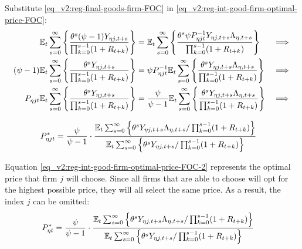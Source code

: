 \documentclass[../thesis.tex]{subfiles}
\begin{document}

Substitute \ref{eq_v2:reg-final-goods-firm-FOC} in \ref{eq_v2:reg-int-good-firm-optimal-price-FOC}:
\begin{alignat}{2}
	{\mathbb{E}_{t}} \sum_{s=0}^{\infty} \Bigg\{ \frac{\theta^s (\psi-1) Y_{\eta j,t+s}}{\prod_{k=0}^{s-1}(1+R_{t+k})} \Bigg\} &= {\mathbb{E}_{t}} \sum_{s=0}^{\infty} \Bigg\{ \frac{\theta^s \psi P_{\eta jt}^{-1} Y_{\eta j,t+s} \Lambda_{\eta, t+s}}{\prod_{k=0}^{s-1}(1+R_{t+k})}  \Bigg\} &\implies \nonumber \\
	(\psi-1) {\mathbb{E}_{t}} \sum_{s=0}^{\infty} \Bigg\{ \frac{\theta^s Y_{\eta j,t+s}}{\prod_{k=0}^{s-1}(1+R_{t+k})} \Bigg\} &= \psi P_{\eta jt}^{-1} {\mathbb{E}_{t}} \sum_{s=0}^{\infty} \Bigg\{ \frac{\theta^s Y_{\eta j,t+s} \Lambda_{\eta, t+s}}{\prod_{k=0}^{s-1}(1+R_{t+k})}  \Bigg\} &\implies \nonumber \\
	P_{\eta jt} {\mathbb{E}_{t}} \sum_{s=0}^{\infty} \Bigg\{ \frac{\theta^s Y_{\eta j,t+s}}{\prod_{k=0}^{s-1}(1+R_{t+k})} \Bigg\} &= \frac{\psi}{\psi-1} {\mathbb{E}_{t}} \sum_{s=0}^{\infty} \Bigg\{ \frac{\theta^s Y_{\eta j,t+s} \Lambda_{\eta, t+s}}{\prod_{k=0}^{s-1}(1+R_{t+k})}  \Bigg\} &\implies \nonumber
\end{alignat}

\vspace*{-1cm}

\begin{align}
	\label{eq_v2:reg-int-good-firm-optimal-price-FOC-2}
	P_{\eta jt}^{\ast} &= 
	\frac{\psi}{\psi-1} \cdot
	\frac{
		{\mathbb{E}_{t}} \sum_{s=0}^{\infty} \left\{ 
		\theta^s Y_{\eta j,t+s} \Lambda_{\eta, t+s} / \prod_{k=0}^{s-1}(1+R_{t+k}) \right\}} {{\mathbb{E}_{t}} \sum_{s=0}^{\infty} \left\{
		\theta^s Y_{\eta j,t+s} / \prod_{k=0}^{s-1}(1+R_{t+k}) \right\}}
\end{align}


Equation \ref{eq_v2:reg-int-good-firm-optimal-price-FOC-2} represents the optimal price that firm $j$ will choose. Since all firms that are able to choose will opt for the highest possible price, they will all select the same price. As a result, the index $j$ can be omitted:
\begin{align}
	\label{eq_v2:reg-int-good-firm-optimal-price-FOC-3}
	P_{\eta t}^{\ast} &= 
	\frac{\psi}{\psi-1} \cdot
	\frac{
		{\mathbb{E}_{t}} \sum_{s=0}^{\infty} \left\{ 
		\theta^s Y_{\eta j,t+s} \Lambda_{\eta, t+s} / \prod_{k=0}^{s-1}(1+R_{t+k}) \right\}} {{\mathbb{E}_{t}} \sum_{s=0}^{\infty} \left\{
		\theta^s Y_{\eta j,t+s} / \prod_{k=0}^{s-1}(1+R_{t+k}) \right\}}
\end{align}

\end{document}
